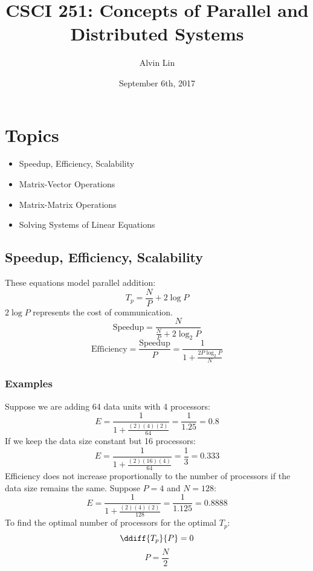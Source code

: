 \documentclass[letterpaper, 12pt]{math}
\title{CSCI 251: Concepts of Parallel and Distributed Systems}
\author{Alvin Lin}
\date{September 6th, 2017}
\begin{document}
\maketitle

\section*{Topics}
\begin{itemize}
  \item Speedup, Efficiency, Scalability
  \item Matrix-Vector Operations
  \item Matrix-Matrix Operations
  \item Solving Systems of Linear Equations
\end{itemize}

\subsection*{Speedup, Efficiency, Scalability}
These equations model parallel addition:
\[ T_p = \frac{N}{P}+2\log P \]
\( 2\log P \) represents the cost of communication.
\[ \text{Speedup} = \frac{N}{\frac{N}{P}+2\log_2 P} \]
\[ \text{Efficiency} = \frac{\text{Speedup}}{P} =
  \frac{1}{1+\frac{2P\log_2 P}{N}} \]

\subsubsection*{Examples}
Suppose we are adding 64 data units with 4 processors:
\[ E = \frac{1}{1+\frac{(2)(4)(2)}{64}} = \frac{1}{1.25} = 0.8 \]
If we keep the data size constant but 16 processors:
\[ E = \frac{1}{1+\frac{(2)(16)(4)}{64}} = \frac{1}{3} = 0.333 \]
Efficiency does not increase proportionally to the number of processors if the
data size remains the same. Suppose \( P = 4 \) and \( N = 128 \):
\[ E = \frac{1}{1+\frac{(2)(4)(2)}{128}} = \frac{1}{1.125} = 0.8888 \]
To find the optimal number of processors for the optimal \( T_p \):
\[ \ddiff{T_p}{P} = 0 \]
\[ P = \frac{N}{2} \]
\end{document}
